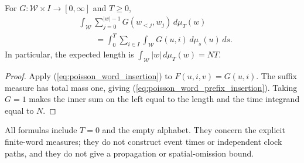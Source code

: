 \begin{corollary}
\label{cor:poisson_word_insertion_prefix}
\leanok
{}
For $G:\mathcal W\times I\to[0,\infty]$ and $T\ge0$,
\begin{equation}
\label{eq:poisson_word_prefix_insertion}
\begin{aligned}
 &\int_{\mathcal W}\sum_{j=0}^{|w|-1}G(w_{<j},w_j)\,d\mu_T(w)\\
 &\qquad=\int_0^T\sum_{i\in I}\int_{\mathcal W}G(u,i)\,d\mu_s(u)\,ds.
\end{aligned}
\end{equation}
In particular, the expected length is $\int_{\mathcal W}|w|\,d\mu_T(w)=NT$.
\end{corollary}
\begin{proof}
\leanok
{}
Apply (\ref{eq:poisson_word_insertion}) to $F(u,i,v)=G(u,i)$.
The suffix measure has total mass one, giving
(\ref{eq:poisson_word_prefix_insertion}).  Taking $G=1$ makes the inner
sum on the left equal to the length and the time integrand equal to $N$.
\end{proof}

All formulas include $T=0$ and the empty alphabet.  They concern the
explicit finite-word measures; they do not construct event times or
independent clock paths, and they do not give a propagation or
spatial-omission bound.
